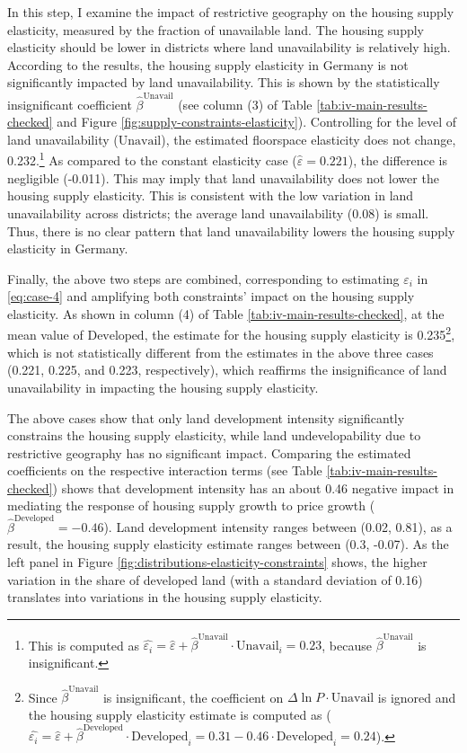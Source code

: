 \documentclass[
  12pt,
]{article}
\begin{document}
In this step, I examine the impact of restrictive geography on the housing supply elasticity, measured by the fraction of unavailable land. The housing supply elasticity should be lower in districts where land unavailability is relatively high. According to the results, the housing supply elasticity in Germany is not significantly impacted by land unavailability. This is shown by the statistically insignificant coefficient \(\widehat{\beta}^{\text{Unavail}}\) (see column (3) of Table \ref{tab:iv-main-results-checked} and Figure \ref{fig:supply-constraints-elasticity}). Controlling for the level of land unavailability (\(\text{Unavail}\)), the estimated floorspace elasticity does not change, 0.232.\footnote{This is computed as \(\widehat{\varepsilon_i} =\widehat{\varepsilon} + \widehat{\beta}^{\text{Unavail}}\cdot\text{Unavail}_i = 0.23\), because \(\widehat{\beta}^{\text{Unavail}}\) is insignificant.} As compared to the constant elasticity case (\(\widehat{\varepsilon}=0.221\)), the difference is negligible (-0.011). This may imply that land unavailability does not lower the housing supply elasticity. This is consistent with the low variation in land unavailability across districts; the average land unavailability (0.08) is small. Thus, there is no clear pattern that land unavailability lowers the housing supply elasticity in Germany.

Finally, the above two steps are combined, corresponding to estimating \(\varepsilon_i\) in \eqref{eq:case-4} and amplifying both constraints' impact on the housing supply elasticity. As shown in column (4) of Table \ref{tab:iv-main-results-checked}, at the mean value of \(\text{Developed}\), the estimate for the housing supply elasticity is 0.235\footnote{Since \(\widehat{\beta}^{\text{Unavail}}\) is insignificant, the coefficient on \(\Delta\ln P\cdot\text{Unavail}\) is ignored and the housing supply elasticity estimate is computed as (\(\widehat{\varepsilon_i} = \widehat{\varepsilon} + \widehat{\beta}^{\text{Developed}}\cdot\text{Developed}_i = 0.31 -0.46 \cdot\text{Developed}_i = 0.24\)).}, which is not statistically different from the estimates in the above three cases (0.221, 0.225, and 0.223, respectively), which reaffirms the insignificance of land unavailability in impacting the housing supply elasticity.

The above cases show that only land development intensity significantly constrains the housing supply elasticity, while land undevelopability due to restrictive geography has no significant impact. Comparing the estimated coefficients on the respective interaction terms (see Table \ref{tab:iv-main-results-checked}) shows that development intensity has an about 0.46 negative impact in mediating the response of housing supply growth to price growth (\(\widehat{\beta}^{\text{Developed}} = -0.46\)). Land development intensity ranges between (0.02, 0.81), as a result, the housing supply elasticity estimate ranges between (0.3, -0.07). As the left panel in Figure \ref{fig:distributions-elasticity-constraints} shows, the higher variation in the share of developed land (with a standard deviation of 0.16) translates into variations in the housing supply elasticity.
\end{document}
